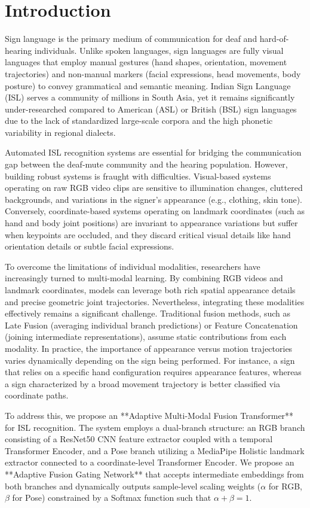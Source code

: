 \documentclass[conference]{IEEEtran}
\begin{document}
\section{Introduction}
Sign language is the primary medium of communication for deaf and hard-of-hearing individuals. Unlike spoken languages, sign languages are fully visual languages that employ manual gestures (hand shapes, orientation, movement trajectories) and non-manual markers (facial expressions, head movements, body posture) to convey grammatical and semantic meaning. Indian Sign Language (ISL) serves a community of millions in South Asia, yet it remains significantly under-researched compared to American (ASL) or British (BSL) sign languages due to the lack of standardized large-scale corpora and the high phonetic variability in regional dialects.

Automated ISL recognition systems are essential for bridging the communication gap between the deaf-mute community and the hearing population. However, building robust systems is fraught with difficulties. Visual-based systems operating on raw RGB video clips are sensitive to illumination changes, cluttered backgrounds, and variations in the signer's appearance (e.g., clothing, skin tone). Conversely, coordinate-based systems operating on landmark coordinates (such as hand and body joint positions) are invariant to appearance variations but suffer when keypoints are occluded, and they discard critical visual details like hand orientation details or subtle facial expressions. 

To overcome the limitations of individual modalities, researchers have increasingly turned to multi-modal learning. By combining RGB videos and landmark coordinates, models can leverage both rich spatial appearance details and precise geometric joint trajectories. Nevertheless, integrating these modalities effectively remains a significant challenge. Traditional fusion methods, such as Late Fusion (averaging individual branch predictions) or Feature Concatenation (joining intermediate representations), assume static contributions from each modality. In practice, the importance of appearance versus motion trajectories varies dynamically depending on the sign being performed. For instance, a sign that relies on a specific hand configuration requires appearance features, whereas a sign characterized by a broad movement trajectory is better classified via coordinate paths.

To address this, we propose an **Adaptive Multi-Modal Fusion Transformer** for ISL recognition. The system employs a dual-branch structure: an RGB branch consisting of a ResNet50 CNN feature extractor coupled with a temporal Transformer Encoder, and a Pose branch utilizing a MediaPipe Holistic landmark extractor connected to a coordinate-level Transformer Encoder. We propose an **Adaptive Fusion Gating Network** that accepts intermediate embeddings from both branches and dynamically outputs sample-level scaling weights ($\alpha$ for RGB, $\beta$ for Pose) constrained by a Softmax function such that $\alpha + \beta = 1$. 
\end{document}
